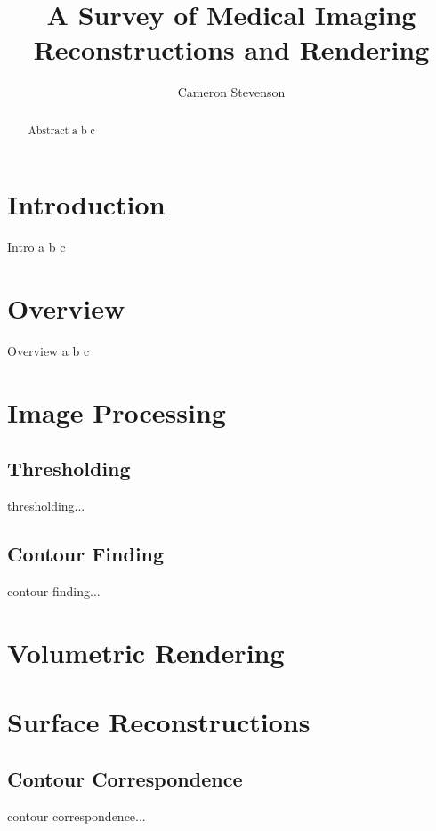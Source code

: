 \documentclass[acmsmall]{acmart}
\begin{document}
\title{A Survey of Medical Imaging Reconstructions and Rendering}
\author{Cameron Stevenson}
 
\begin{abstract}
Abstract a b c
\end{abstract}

\maketitle

\section{Introduction}

Intro a b c

\section{Overview}

Overview a b c

\section{Image Processing}

\subsection{Thresholding}
thresholding...

\subsection{Contour Finding}
contour finding...

\section{Volumetric Rendering}

\section{Surface Reconstructions}
\subsection{Contour Correspondence}
contour correspondence...
\end{document}
